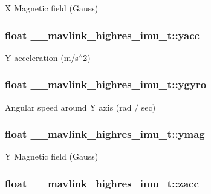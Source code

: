 X Magnetic field (Gauss) 

\hypertarget{struct____mavlink__highres__imu__t_aedf7c76d0487a09e980851fd6162ae17}{
\subsubsection[{yacc}]{\setlength{\rightskip}{0pt plus 5cm}float \+\_\+\+\_\+mavlink\+\_\+highres\+\_\+imu\+\_\+t\+::yacc}}\label{struct____mavlink__highres__imu__t_aedf7c76d0487a09e980851fd6162ae17}


Y acceleration (m/s$^\wedge$2) 

\hypertarget{struct____mavlink__highres__imu__t_a593f56b2ae4f9d85c8e9f8a06e28aef3}{
\subsubsection[{ygyro}]{\setlength{\rightskip}{0pt plus 5cm}float \+\_\+\+\_\+mavlink\+\_\+highres\+\_\+imu\+\_\+t\+::ygyro}}\label{struct____mavlink__highres__imu__t_a593f56b2ae4f9d85c8e9f8a06e28aef3}


Angular speed around Y axis (rad / sec) 

\hypertarget{struct____mavlink__highres__imu__t_aa887e516e745fef0f051856c46b8e0f6}{
\subsubsection[{ymag}]{\setlength{\rightskip}{0pt plus 5cm}float \+\_\+\+\_\+mavlink\+\_\+highres\+\_\+imu\+\_\+t\+::ymag}}\label{struct____mavlink__highres__imu__t_aa887e516e745fef0f051856c46b8e0f6}


Y Magnetic field (Gauss) 

\hypertarget{struct____mavlink__highres__imu__t_a01f05eb6ed0c4b0db807f22bf6134ab4}{
\subsubsection[{zacc}]{\setlength{\rightskip}{0pt plus 5cm}float \+\_\+\+\_\+mavlink\+\_\+highres\+\_\+imu\+\_\+t\+::zacc}}\label{struct____mavlink__highres__imu__t_a01f05eb6ed0c4b0db807f22bf6134ab4}


